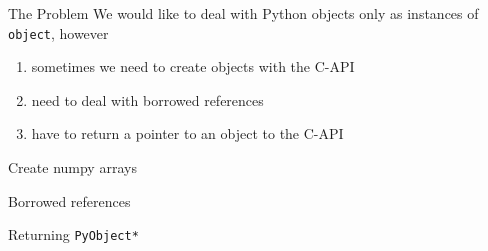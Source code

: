 
\begin{frame}[fragile]{The Problem}
    We would like to deal with Python objects only as instances of
    \texttt{object}, however
    \begin{enumerate}
        \item sometimes we need to create objects with the C-API
        \item need to deal with borrowed references
        \item have to return a pointer to an object to the C-API
    \end{enumerate}
\end{frame}

\begin{frame}[fragile]{Create numpy arrays}
\end{frame}


\begin{frame}[fragile]{Borrowed references}
\end{frame}

\begin{frame}[fragile]{Returning \texttt{PyObject*}}
\end{frame}
